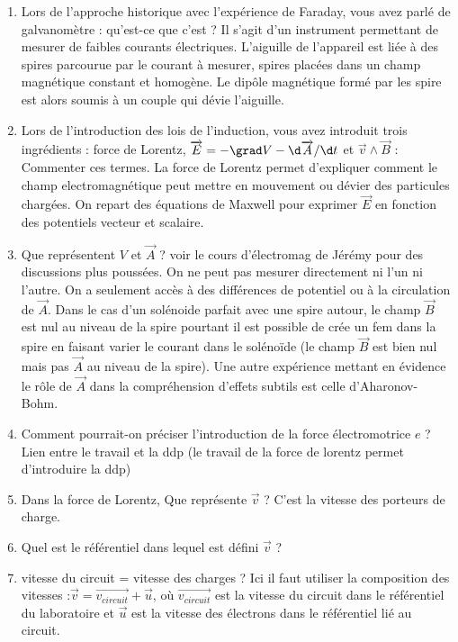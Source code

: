 \begin{enumerate}
\item Lors de l'approche historique avec l'expérience de Faraday, vous avez parlé de galvanomètre : qu'est-ce que c'est ? Il s'agit d'un instrument permettant de mesurer de faibles courants électriques.
L'aiguille de l'appareil est liée à des spires parcourue par le courant à mesurer, spires placées dans un champ magnétique constant et homogène.
Le dipôle magnétique formé par les spire est alors soumis à un couple qui dévie l'aiguille.
\item Lors de l'introduction des lois de l'induction, vous avez introduit trois ingrédients : force de Lorentz, $\overrightarrow{E} = -\grad V - \d\overrightarrow{A}/\d t$ et $\overrightarrow{v}\wedge\overrightarrow{B}$ : Commenter ces termes. La force de Lorentz permet d'expliquer comment le champ electromagnétique peut mettre en mouvement ou dévier des particules chargées.
On repart des équations de Maxwell pour exprimer $\overrightarrow{E}$ en fonction des potentiels vecteur et scalaire.
\item Que représentent $V$ et $\overrightarrow{A}$ ?
voir le cours d'électromag de Jérémy pour des discussions plus poussées.
On ne peut pas mesurer directement ni l'un ni l'autre.
On a seulement accès à des différences de potentiel ou à la circulation de $\overrightarrow{A}$.
Dans le cas d'un solénoide parfait avec une spire autour, le champ $\overrightarrow{B}$ est nul au niveau de la spire pourtant il est possible de crée un fem dans la spire en faisant varier le courant dans le solénoïde (le champ $\overrightarrow{B}$ est bien nul mais pas $\overrightarrow{A}$ au niveau de la spire).
Une autre expérience mettant en évidence le rôle de $\overrightarrow{A}$ dans la compréhension d'effets subtils est celle d'Aharonov-Bohm.
\item Comment pourrait-on préciser l'introduction de la force électromotrice $e$ ? Lien entre le travail et la ddp (le travail de la force de lorentz permet d'introduire la ddp)
\item Dans la force de Lorentz, Que représente $\overrightarrow{v}$ ? C'est la vitesse des porteurs de charge.
\item Quel est le référentiel dans lequel est défini $\overrightarrow{v}$ ?
\item vitesse du circuit = vitesse des charges ?
Ici il faut utiliser la composition des vitesses :$\overrightarrow{v} = \overrightarrow{v_{circuit}} + \overrightarrow{u}$, où $\overrightarrow{v_{circuit}}$ est la vitesse du circuit dans le référentiel du laboratoire et $\overrightarrow{u}$ est la vitesse des électrons dans le référentiel lié au circuit.

\end{enumerate}
